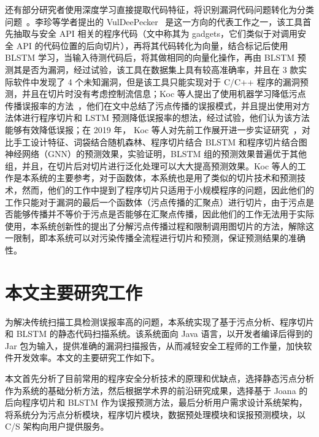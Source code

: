 还有部分研究者使用深度学习直接提取代码特征，将识别漏洞代码问题转化为分类问题~\cite{vuldeepecker,Koc2017,Koc2019}。李珍等学者提出的 VulDeePecker~\cite{vuldeepecker} 是这一方向的代表工作之一，该工具首先抽取与安全 API 相关的程序代码（文中称其为 gadgets，它们类似于对调用安全 API 的代码位置的后向切片），再将其代码转化为向量，结合标记后使用 BLSTM 学习，当输入待测代码后，将其做相同的向量化操作，再由 BLSTM 预测其是否为漏洞，经过试验，该工具在数据集上具有较高准确率，并且在 3 款实际软件中发现了 4 个未知漏洞，但是该工具只能实现对于 C/C++ 程序的漏洞预测，并且在切片时没有考虑控制流信息；Koc 等人提出了使用机器学习降低污点传播误报率的方法~\cite{Koc2017}，他们在文中总结了污点传播的误报模式，并且提出使用对方法体进行程序切片和 LSTM 预测降低误报率的想法，经过试验，他们认为该方法能够有效降低误报；在 2019 年， Koc 等人对先前工作展开进一步实证研究~\cite{Koc2019}，对比手工设计特征、词袋结合随机森林、程序切片结合 BLSTM 和程序切片结合图神经网络（GNN）的预测效果，实验证明，BLSTM 组的预测效果普遍优于其他组，并且，在切片后对切片进行泛化处理可以大大提高预测效果。Koc 等人的工作是本系统的主要参考，对于函数体，本系统也是用了类似的切片技术和预测技术，然而，他们的工作中提到了程序切片只适用于小规模程序的问题，因此他们的工作只能对于漏洞的最后一个函数体（污点传播的汇聚点）进行切片，由于污点是否能够传播并不等价于污点是否能够在汇聚点传播，因此他们的工作无法用于实际使用，本系统创新性的提出了分解污点传播过程和限制调用图切片的方法，解除这一限制，即本系统可以对污染传播全流程进行切片和预测，保证预测结果的准确性。



\section{本文主要研究工作}
为解决传统扫描工具检测误报率高的问题，本系统实现了基于污点分析、程序切片和 BLSTM 的静态代码扫描系统。该系统面向 Java 语言，以开发者编译后得到的 Jar 包为输入，提供准确的漏洞扫描报告，从而减轻安全工程师的工作量，加快软件开发效率。本文的主要研究工作如下。

本文首先分析了目前常用的程序安全分析技术的原理和优缺点，选择静态污点分析作为系统的基础分析方法，然后根据学术界的前沿研究成果，选择基于 Joana 的后向程序切片和 BLSTM 作为误报预测方法，最后分析用户需求设计系统架构，将系统分为污点分析模块，程序切片模块，数据预处理模块和误报预测模块，以 C/S 架构向用户提供服务。


